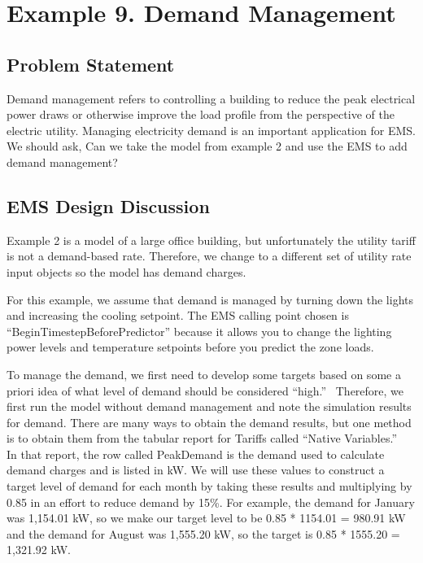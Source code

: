\section{Example 9. Demand Management}\label{example-9.-demand-management}

\subsection{Problem Statement}\label{problem-statement-011}

Demand management refers to controlling a building to reduce the peak electrical power draws or otherwise improve the load profile from the perspective of the electric utility. Managing electricity demand is an important application for EMS. We should ask, Can we take the model from example 2 and use the EMS to add demand management?

\subsection{EMS Design Discussion}\label{ems-design-discussion-011}

Example 2 is a model of a large office building, but unfortunately the utility tariff is not a demand-based rate. Therefore, we change to a different set of utility rate input objects so the model has demand charges.

For this example, we assume that demand is managed by turning down the lights and increasing the cooling setpoint. The EMS calling point chosen is ``BeginTimestepBeforePredictor'' because it allows you to change the lighting power levels and temperature setpoints before you predict the zone loads.

To manage the demand, we first need to develop some targets based on some a priori idea of what level of demand should be considered ``high.''~ Therefore, we first run the model without demand management and note the simulation results for demand. There are many ways to obtain the demand results, but one method is to obtain them from the tabular report for Tariffs called ``Native Variables.''~ In that report, the row called PeakDemand is the demand used to calculate demand charges and is listed in kW. We will use these values to construct a target level of demand for each month by taking these results and multiplying by 0.85 in an effort to reduce demand by 15\%. For example, the demand for January was 1,154.01 kW, so we make our target level to be 0.85 * 1154.01 = 980.91 kW and the demand for August was 1,555.20 kW, so the target is 0.85 * 1555.20 = 1,321.92 kW.

